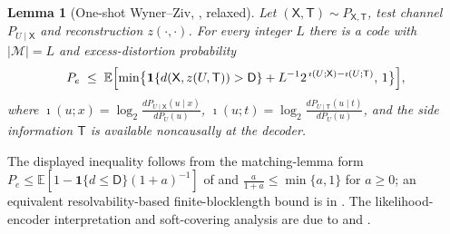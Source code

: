 \documentclass[11pt]{article}
\newcommand{\E}{\mathbb{E}}
\theoremstyle{plain}
\newtheorem{lemma}[theorem]{Lemma}
\theoremstyle{definition}
\theoremstyle{remark}
\begin{document}
\begin{lemma}[One-shot Wyner--Ziv, {\citealp[Thm.~3]{liananantharam2021poisson}}, relaxed]
\label{lem:op-oneshot}
Let $(\mathsf X,\mathsf T)\sim P_{\mathsf X,\mathsf T}$, test channel
$P_{U\mid\mathsf X}$ and reconstruction $z(\cdot,\cdot)$. For every
integer $L$ there is a code with $|\mathcal M|=L$ and excess-distortion
probability
\[
P_e\;\le\;\E\Bigl[\min\bigl\{\mathbf 1\{d(\mathsf X,z(U,\mathsf T))>\mathsf D\}
+L^{-1}2^{\,\imath(U;\mathsf X)-\imath(U;\mathsf T)},\,1\bigr\}\Bigr],
\]
where $\imath(u;x)=\log_2\frac{dP_{U\mid\mathsf X}(u\mid x)}{dP_U(u)}$,
$\imath(u;t)=\log_2\frac{dP_{U\mid\mathsf T}(u\mid t)}{dP_U(u)}$, and
the side information $\mathsf T$ is available noncausally at the
decoder.
\end{lemma}
The displayed inequality follows from the matching-lemma form
$P_e\le\E[1-\mathbf 1\{d\le\mathsf D\}(1+a)^{-1}]$ of
\citet{liananantharam2021poisson} and $\frac{a}{1+a}\le\min\{a,1\}$ for
$a\ge0$; an equivalent resolvability-based finite-blocklength bound is
in \citet{watanabe2015nonasymptotic}. The likelihood-encoder
interpretation and soft-covering analysis are due to
\citet{songcuffpoor2016likelihood} and \citet{cover2006elements}.
\end{document}
